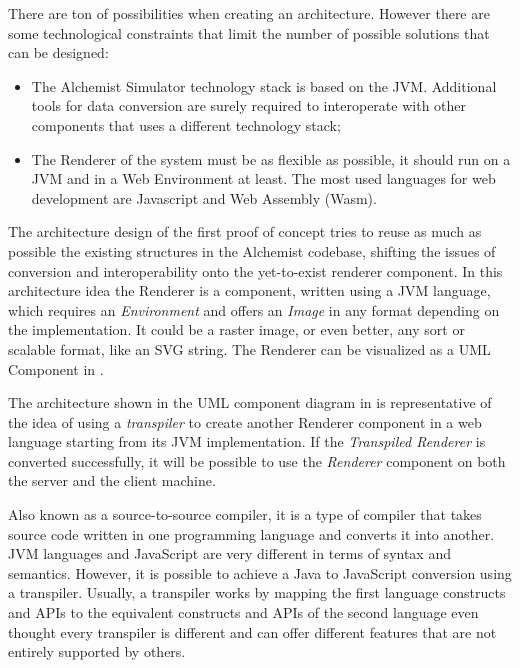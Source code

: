 There are ton of possibilities when creating an architecture. However there are some technological constraints that limit the number of possible solutions that can be designed:
\begin{itemize}
	\item The Alchemist Simulator technology stack is based on the JVM. Additional tools for data conversion are surely required to interoperate with other components that uses a different technology stack;
	\item The Renderer of the system must be as flexible as possible, it should run on a JVM and in a Web Environment at least. The most used languages for web development are Javascript and Web Assembly (Wasm).
\end{itemize}

The architecture design of the first proof of concept tries to reuse as much as possible the existing structures in the Alchemist codebase, shifting the issues of conversion and interoperability  onto the yet-to-exist renderer component. In this architecture idea the Renderer is a component, written using a JVM language, which requires an \textit{Environment} and offers an \textit{Image} in any format depending on the implementation. It could be a raster image, or even better, any sort or scalable format, like an SVG string. The Renderer can be visualized as a UML Component in .


The architecture shown in the UML component diagram in  is representative of the idea of using a \textit{transpiler} to create another Renderer component in a web language starting from its JVM implementation. If the \textit{Transpiled Renderer} is converted successfully, it will be possible to use the \textit{Renderer} component on both the server and the client machine.

\begin{info}[Transpiler:]
	Also known as a source-to-source compiler, it is a type of compiler that takes source code written in one programming language and converts it into another. JVM languages and JavaScript are very different in terms of syntax and semantics. However, it is possible to achieve a Java to JavaScript conversion using a transpiler.
	Usually, a transpiler works by mapping the first language constructs and APIs to the equivalent constructs and APIs of the second language even thought every transpiler is different and can offer different features that are not entirely supported by others.
\end{info}

